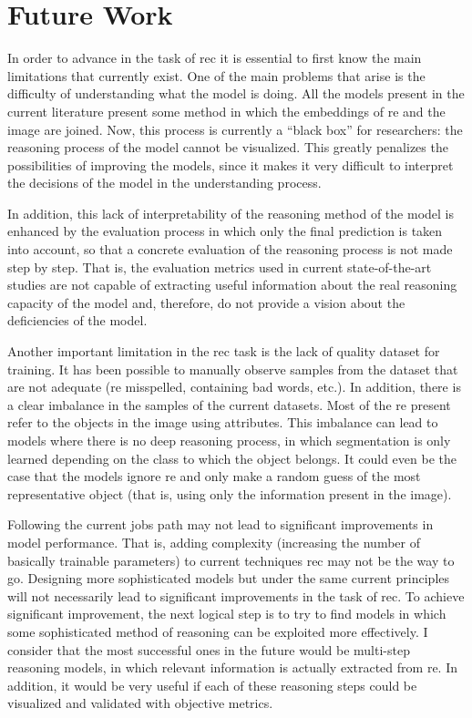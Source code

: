 \section{Future Work}

In order to advance in the task of \gls{rec} it is essential to first know the
main limitations that currently exist. One of the main problems that arise is
the difficulty of understanding what the model is doing. All the models present
in the current literature present some method in which the embeddings of
\gls{re} and the image are joined. Now, this process is currently a ``black
box'' for researchers: the reasoning process of the model cannot be
visualized. This greatly penalizes the possibilities of improving the models,
since it makes it very difficult to interpret the decisions of the model in the
understanding process.

In addition, this lack of interpretability of the reasoning method of the model
is enhanced by the evaluation process in which only the final prediction is
taken into account, so that a concrete evaluation of the reasoning process is
not made step by step. That is, the evaluation metrics used in current
state-of-the-art studies are not capable of extracting useful information about
the real reasoning capacity of the model and, therefore, do not provide a
vision about the deficiencies of the model.

Another important limitation in the \gls{rec} task is the lack of quality
dataset for training. It has been possible to manually observe samples from the
dataset that are not adequate (\gls{re} misspelled, containing bad words,
etc.). In addition, there is a clear imbalance in the samples of the current
datasets. Most of the \gls{re} present refer to the objects in the image using
attributes. This imbalance can lead to models where there is no deep reasoning
process, in which segmentation is only learned depending on the class to which
the object belongs. It could even be the case that the models ignore \gls{re}
and only make a random guess of the most representative object (that is, using
only the information present in the image).

Following the current jobs path may not lead to significant improvements in
model performance. That is, adding complexity (increasing the number of
basically trainable parameters) to current techniques \gls{rec} may not be the
way to go. Designing more sophisticated models but under the same current
principles will not necessarily lead to significant improvements in the task of
\gls{rec}. To achieve significant improvement, the next logical step is to try
to find models in which some sophisticated method of reasoning can be exploited
more effectively. I consider that the most successful ones in the future would
be multi-step reasoning models, in which relevant information is actually
extracted from \gls{re}. In addition, it would be very useful if each of these
reasoning steps could be visualized and validated with objective metrics.


